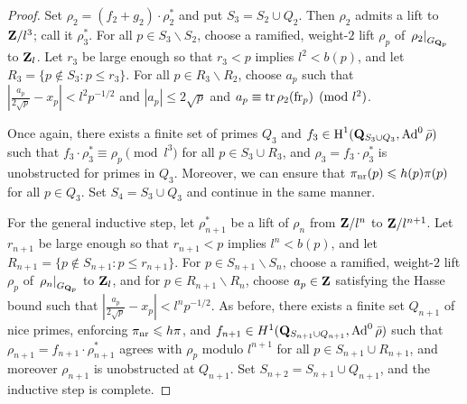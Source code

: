 \begin{proof}
Set $\rho_2 = (f_2+g_2)\cdot\rho_2^\ast$ and put $S_3 = S_2\cup Q_2$. Then 
$\rho_2$ admits a lift to $\mathbf{Z}/l^3$; call it $\rho_3^\ast$. For all 
$p\in S_3\smallsetminus S_2$, choose a ramified, weight-$2$ lift $\rho_p$ of 
$\left.\rho_2\right|_{G_{\mathbf{Q}_p}}$ to $\mathbf{Z}_l$. Let $r_3$ be large enough so that 
$r_3 < p$ implies $l^2 < b(p)$, and let 
$R_3 = \{p\notin S_3 : p\leqslant r_3\}$. For all $p\in R_3\smallsetminus R_2$, 
choose $a_p$ such that $\left|\frac{a_p}{2\sqrt p} - x_p\right| < l^2 p^{-1/2}$ 
and $|a_p| \leqslant 2\sqrt p$ and $a_p \equiv \operatorname{tr}\rho_2(\mathrm{fr}_p)\pmod{l^2}$. 

Once again, there exists a finite set of primes $Q_3$ and 
$f_3\in \operatorname{H}^1(\mathbf{Q}_{S_3\cup Q_3},\operatorname{Ad}^0\bar\rho)$ such that 
$f_3\cdot\rho_3^\ast\equiv \rho_p\pmod{l^3}$ for all $p\in S_3\cup R_3$, and 
$\rho_3 = f_3\cdot\rho_3^\ast$ is unobstructed for primes in $Q_3$. Moreover, 
we can ensure that $\pi_{\mathrm{nr}}(p) \leqslant h(p) \pi(p)$ for all $p\in Q_3$. Set 
$S_4 = S_3\cup Q_3$ and continue in the same manner. 

For the general inductive step, let $\rho_{n+1}^\ast$ be a lift of $\rho_n$ 
from $\mathbf{Z}/l^n$ to $\mathbf{Z}/l^{n+1}$. Let $r_{n+1}$ be large enough so that 
$r_{n+1} < p$ implies $l^n < b(p)$, and let 
$R_{n+1} = \{p\notin S_{n+1} : p\leqslant r_{n+1}\}$. For 
$p\in S_{n+1}\smallsetminus S_n$, choose a ramified, weight-$2$ lift $\rho_p$ 
of $\left.\rho_n\right|_{G_{\mathbf{Q}_p}}$ to $\mathbf{Z}_l$, and for 
$p\in R_{n+1}\smallsetminus R_n$, choose $a_p\in \mathbf{Z}$ satisfying the Hasse 
bound such that $\left|\frac{a_p}{2\sqrt p} - x_p\right| < l^n p^{-1/2}$. As 
before, there exists a finite set $Q_{n+1}$ of nice primes, enforcing 
$\pi_{\mathrm{nr}} \leqslant h \pi$, and 
$f_{n+1}\in H^1(\mathbf{Q}_{S_{n+1}\cup Q_{n+1}},\operatorname{Ad}^0\bar\rho)$ such that 
$\rho_{n+1} = f_{n+1}\cdot\rho_{n+1}^\ast$ agrees with $\rho_p$ modulo 
$l^{n+1}$ for all $p\in S_{n+1}\cup R_{n+1}$, and moreover $\rho_{n+1}$ is 
unobstructed at $Q_{n+1}$. Set $S_{n+2} = S_{n+1} \cup Q_{n+1}$, and the 
inductive step is complete. 
\end{proof}
